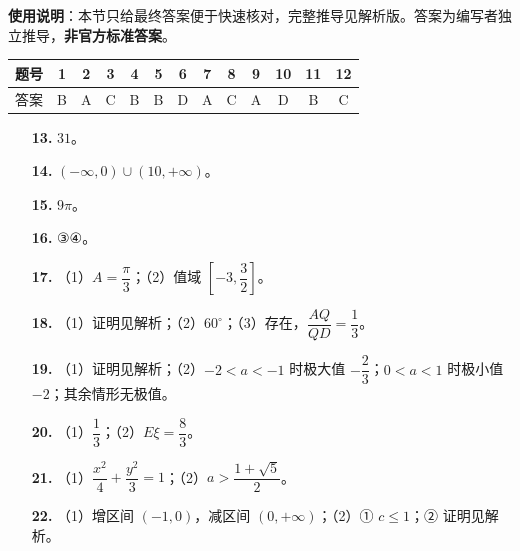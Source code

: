 
\begin{gknotice}
\textbf{使用说明}：本节只给最终答案便于快速核对，完整推导见解析版。答案为编写者独立推导，\textbf{非官方标准答案}。
\end{gknotice}

\begin{center}\begin{tabular}{ccccccccccccc}
\toprule
题号 & 1 & 2 & 3 & 4 & 5 & 6 & 7 & 8 & 9 & 10 & 11 & 12 \\
\midrule
答案 & B & A & C & B & B & D & A & C & A & D & B & C \\
\bottomrule
\end{tabular}\end{center}

\begin{itemize}[leftmargin=2.6em]
  \item[\textbf{13.}] $31$。
  \item[\textbf{14.}] $(-\infty,0)\cup(10,+\infty)$。
  \item[\textbf{15.}] $9\pi$。
  \item[\textbf{16.}] ③④。
\end{itemize}

\begin{itemize}[leftmargin=2.6em]
  \item[\textbf{17.}] （1）$A=\dfrac{\pi}3$；（2）值域 $\left[-3,\dfrac32\right]$。
  \item[\textbf{18.}] （1）证明见解析；（2）$60^\circ$；（3）存在，$\dfrac{AQ}{QD}=\dfrac13$。
  \item[\textbf{19.}] （1）证明见解析；（2）$-2<a<-1$ 时极大值 $-\dfrac23$；$0<a<1$ 时极小值 $-2$；其余情形无极值。
  \item[\textbf{20.}] （1）$\dfrac13$；（2）$E\xi=\dfrac83$。
  \item[\textbf{21.}] （1）$\dfrac{x^2}4+\dfrac{y^2}3=1$；（2）$a>\dfrac{1+\sqrt5}2$。
  \item[\textbf{22.}] （1）增区间 $(-1,0)$，减区间 $(0,+\infty)$；（2）① $c\leqslant1$；② 证明见解析。
\end{itemize}
